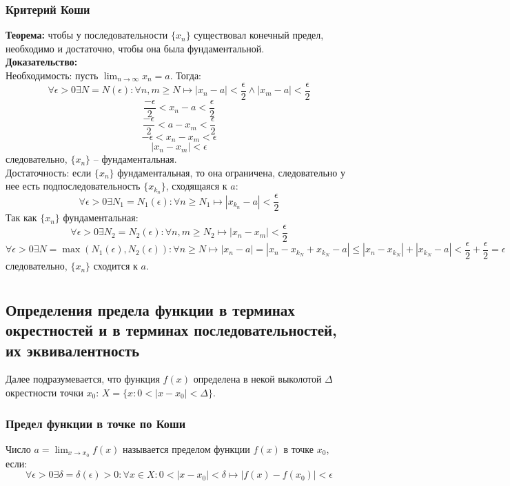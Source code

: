 \documentclass{article}
\begin{document}
        \subsubsection*{Критерий Коши}
        \textbf{Теорема:} чтобы у последовательности $\{x_n\}$ существовал конечный предел, необходимо и достаточно,
        чтобы она была фундаментальной.
        \\
        \textbf{Доказательство:}
        \\
        Необходимость: пусть $\lim_{n\to\infty} x_n = a$. Тогда:
        \[ \forall \epsilon > 0 \exists N = N(\epsilon): \forall n, m \ge N \longmapsto |x_n - a| < \frac{\epsilon}{2} \wedge |x_m - a| < \frac{\epsilon}{2} \]
        \[ \frac{-\epsilon}{2} < x_n - a < \frac{\epsilon}{2} \]
        \[ \frac{-\epsilon}{2} < a - x_m < \frac{\epsilon}{2} \]
        \[ -\epsilon < x_n - x_m < \epsilon \]
        \[ |x_n - x_m| < \epsilon \]
        следовательно, $\{x_n\}$ -- фундаментальная.
        \\
        Достаточность: если $\{x_n\}$ фундаментальная, то она ограничена, следовательно у нее есть подпоследовательность $\{x_{k_n}\}$, сходящаяся к $a$:
        \[ \forall \epsilon > 0 \exists N_1 = N_1(\epsilon): \forall n \ge N_1 \longmapsto |x_{k_n} - a| < \frac{\epsilon}{2} \]
        Так как $\{x_n\}$ фундаментальная:
        \[ \forall \epsilon > 0 \exists N_2 = N_2(\epsilon): \forall n,m \ge N_2 \longmapsto |x_n - x_m| < \frac{\epsilon}{2} \]
        \[ \forall \epsilon > 0 \exists N = \max(N_1(\epsilon), N_2(\epsilon)): \forall n \ge N \longmapsto |x_n - a| = |x_n - x_{k_N} + x_{k_N} - a|
        \le |x_n - x_{k_N}| + |x_{k_N} - a| < \frac{\epsilon}{2} + \frac{\epsilon}{2} = \epsilon \]
        следовательно, $\{x_n\}$ сходится к $a$.
        
        
    \newpage
    
    \section{}
    \subsection*{Определения предела функции в терминах окрестностей и в терминах последовательностей, их эквивалентность}
        Далее подразумевается, что функция $f(x)$ определена в некой выколотой $\Delta$ окрестности точки $x_0$: $X = \{x: 0 < |x - x_0| < \Delta\}$.
        \subsubsection*{Предел функции в точке по Коши}
        Число $a = \lim_{x \to x_0} f(x)$ называется пределом функции $f(x)$ в точке $x_0$, если:
        \[ \forall \epsilon > 0 \exists \delta = \delta(\epsilon)> 0: \forall x \in X: 0 < |x - x_0| < \delta \longmapsto |f(x) - f(x_0)| < \epsilon \]
    
\end{document}
